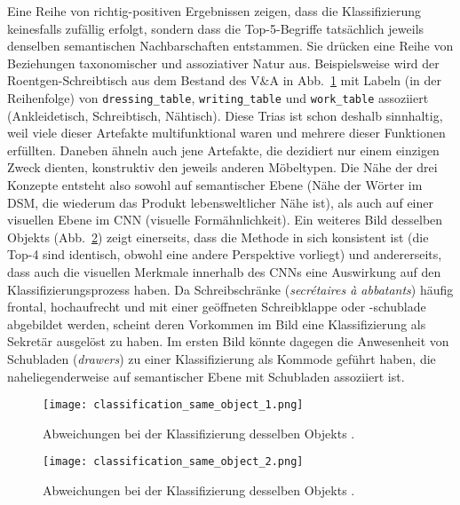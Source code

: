 Eine Reihe von richtig-positiven Ergebnissen zeigen, dass die Klassifizierung keinesfalls zufällig erfolgt, sondern dass die \mbox{Top-5-Begriffe} tatsächlich jeweils denselben semantischen Nachbarschaften entstammen. Sie drücken eine Reihe von Beziehungen taxonomischer und assoziativer Natur aus.
Beispielsweise wird der \mbox{Roentgen-Schreibtisch} aus dem Bestand des V\&A in Abb.~\ref{fig:classification_same_object_1} mit Labeln (in der Reihenfolge) von \texttt{dressing\_table}, \texttt{writing\_table} und \texttt{work\_table} assoziiert (Ankleidetisch, Schreibtisch, Nähtisch). Diese Trias ist schon deshalb sinnhaltig, weil viele dieser Artefakte multifunktional waren und mehrere dieser Funktionen erfüllten. Daneben ähneln auch jene Artefakte, die dezidiert nur einem einzigen Zweck dienten, konstruktiv den jeweils anderen Möbeltypen. Die Nähe der drei Konzepte entsteht also sowohl auf semantischer Ebene (Nähe der Wörter im DSM, die wiederum das Produkt lebensweltlicher Nähe ist), als auch auf einer visuellen Ebene im CNN (visuelle Formähnlichkeit). Ein weiteres Bild desselben Objekts (Abb.~\ref{fig:classification_same_object_2}) zeigt einerseits, dass die Methode in sich konsistent ist (die Top-4 sind identisch, obwohl eine andere Perspektive vorliegt) und andererseits, dass auch die visuellen Merkmale innerhalb des CNNs eine Auswirkung auf den Klassifizierungsprozess haben. Da Schreibschränke (\emph{secrétaires à abbatants}) häufig frontal, hochaufrecht und mit einer geöffneten Schreibklappe oder -schublade abgebildet werden, scheint deren Vorkommen im Bild eine Klassifizierung als Sekretär ausgelöst zu haben. Im ersten Bild könnte dagegen die Anwesenheit von Schubladen (\emph{drawers}) zu einer Klassifizierung als Kommode geführt haben, die naheliegenderweise auf semantischer Ebene mit Schubladen assoziiert ist.

\begin{figure}
	\centering
	\texttt{[image: classification\_same\_object\_1.png]}
	\caption{Abweichungen bei der Klassifizierung desselben Objekts \parencite{victoriaalbertmuseum_WritingTableNeuwiedWorkshopDavid_2019}.}
	\label{fig:classification_same_object_1}
\end{figure}

\begin{figure}
	\centering
	\texttt{[image: classification\_same\_object\_2.png]}
	\caption{Abweichungen bei der Klassifizierung desselben Objekts \parencite{victoriaalbertmuseum_WritingTableNeuwiedWorkshopDavid_2019}.}
	\label{fig:classification_same_object_2}
\end{figure}

